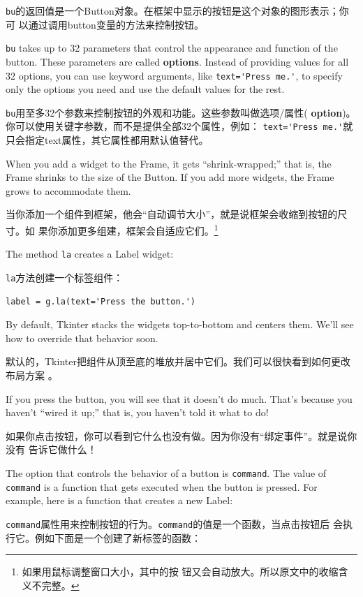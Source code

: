 \documentclass[10pt]{book}
\begin{document}
\begin{CJK}{UTF8}{gbsn}
{\tt bu}的返回值是一个Button对象。在框架中显示的按钮是这个对象的图形表示；你可
以通过调用button变量的方法来控制按钮。

{\tt bu} takes up to 32 parameters that control the appearance
and function of the button.  These parameters are called
{\bf options}.  Instead of providing values for all 32 options,
you can use keyword arguments, like \verb"text='Press me.'",
to specify only the options you need and use the default
values for the rest.

{\tt bu}用至多32个参数来控制按钮的外观和功能。这些参数叫做选项/属性({\bf
option})。你可以使用关键字参数，而不是提供全部32个属性，例如：
\verb"text='Press me.'"就只会指定text属性，其它属性都用默认值替代。

When you add a widget to the Frame, it gets ``shrink-wrapped;''
that is, the Frame shrinks to the size of the Button.  If you
add more widgets, the Frame grows to accommodate them.

当你添加一个组件到框架，他会``自动调节大小''，就是说框架会收缩到按钮的尺寸。如
果你添加更多组建，框架会自适应它们。\footnote{如果用鼠标调整窗口大小，其中的按
钮又会自动放大。所以原文中的收缩含义不完整。}

The method {\tt la} creates a Label widget:

{\tt la}方法创建一个标签组件：

\begin{verbatim}
label = g.la(text='Press the button.')
\end{verbatim}
%
By default, Tkinter stacks the widgets top-to-bottom and centers
them.  We'll see how to override that behavior soon.

默认的，Tkinter把组件从顶至底的堆放并居中它们。我们可以很快看到如何更改布局方案
。

If you press the button, you will see that it doesn't do much.
That's because you haven't ``wired it up;'' that is, you haven't
told it what to do!

如果你点击按钮，你可以看到它什么也没有做。因为你没有``绑定事件''。就是说你没有
告诉它做什么！

The option that controls the behavior of a button is {\tt command}.
The value of {\tt command} is a function that gets executed when
the button is pressed.  For example, here is a function that creates
a new Label:

{\tt command}属性用来控制按钮的行为。{\tt command}的值是一个函数，当点击按钮后
会执行它。例如下面是一个创建了新标签的函数：


\end{CJK}
\end{document}
